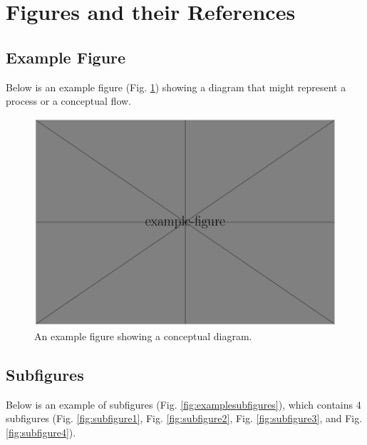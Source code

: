 \documentclass[a4paper]{book}
\begin{document}
\section{Figures and their References}

\subsection{Example Figure}

Below is an example figure (Fig. \ref{fig:examplefig}) showing a diagram that might represent a process or a conceptual flow.

\begin{figure}[htbp]
    \centering
    \includegraphics[width=0.8\linewidth]{example-figure}
    \caption{
        An example figure showing a conceptual diagram.
    }
    \label{fig:examplefig}
\end{figure}

\subsection{Subfigures}

Below is an example of subfigures (Fig. \ref{fig:examplesubfigures}), which contains 4 subfigures (Fig. \ref{fig:subfigure1}, Fig. \ref{fig:subfigure2}, Fig. \ref{fig:subfigure3}, and Fig. \ref{fig:subfigure4}).
\end{document}
